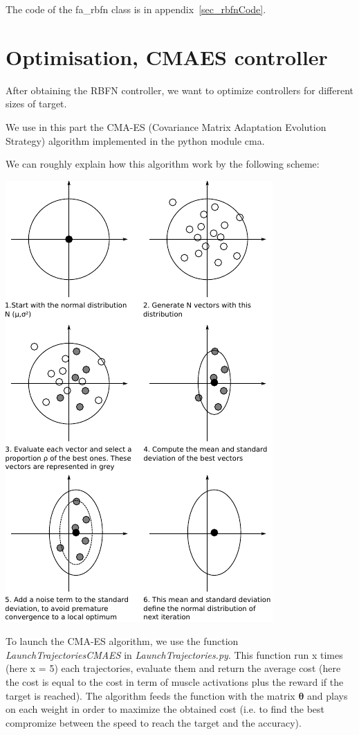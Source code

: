 \documentclass[pdftex,a4paper,12pt]{report}
\begin{document}
The code of the fa\_rbfn class is in appendix~\ref{sec_rbfnCode}.

\section{Optimisation, CMAES controller}
After obtaining the RBFN controller, we want to optimize controllers for different sizes of target.

We use in this part the CMA-ES (Covariance Matrix Adaptation Evolution Strategy) algorithm implemented in the python module cma.

We can roughly explain how this algorithm work by the following scheme:
\begin{center}
\includegraphics[scale=1.5]{figures/cross-entropy.pdf}
\end{center}
To launch the CMA-ES algorithm, we use the function \textit{LaunchTrajectoriesCMAES} in \textit{LaunchTrajectories.py}. This function run x times (here x = 5) each trajectories, evaluate them and return the average cost (here the cost is equal to the cost in term of muscle activations plus the reward if the target is reached). The algorithm feeds the function with the matrix $\boldsymbol{\theta}$ and plays on each weight in order to maximize the obtained cost (i.e. to find the best compromize between the speed to reach the target and the accuracy).
\end{document}
